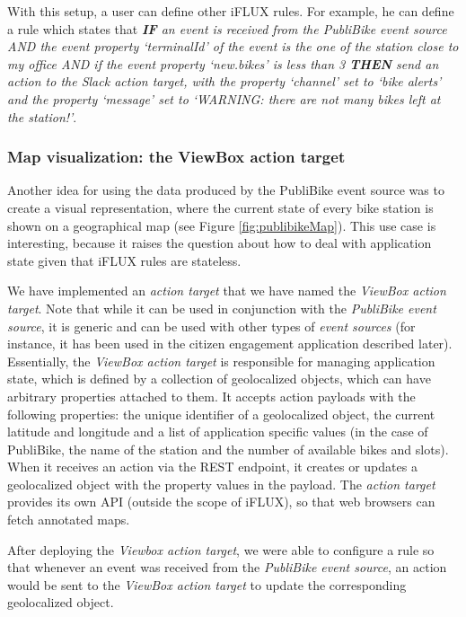 With this setup, a user can define other iFLUX rules. For example, he can define a rule which states that \emph{\textbf{IF} an event is received from the PubliBike event source AND the event property `terminalId' of the event is the one of the station close to my office AND if the event property `new.bikes' is less than 3 \textbf{THEN} send an action to the Slack action target, with the property `channel' set to `bike alerts' and the property `message' set to `WARNING: there are not many bikes left at the station!'}. 

\subsubsection{Map visualization: the ViewBox action target}
Another idea for using the data produced by the PubliBike event source was to create a visual representation, where the current state of every bike station is shown on a geographical map (see Figure \ref{fig:publibikeMap}). This use case is interesting, because it raises the question about how to deal with application state given that iFLUX rules are stateless.

We have implemented an \emph{action target} that we have named the \emph{ViewBox action target}. Note that while it can be used in conjunction with the \emph{PubliBike event source}, it is generic and can be used with other types of \emph{event sources} (for instance, it has been used in the citizen engagement application described later). Essentially, the \emph{ViewBox action target} is responsible for managing application state, which is defined by a collection of geolocalized objects, which can have arbitrary properties attached to them. It accepts action payloads with the following properties: the unique identifier of a geolocalized object, the current latitude and longitude and a list of application specific values (in the case of PubliBike, the name of the station and the number of available bikes and slots). When it receives an action via the REST endpoint, it creates or updates a geolocalized object with the property values in the payload. The \emph{action target} provides its own API (outside the scope of iFLUX), so that web browsers can fetch annotated maps. 

After deploying the \emph{Viewbox action target}, we were able to configure a rule so that whenever an event was received from the \emph{PubliBike event source}, an action would be sent to the \emph{ViewBox action target} to update the corresponding geolocalized object.

